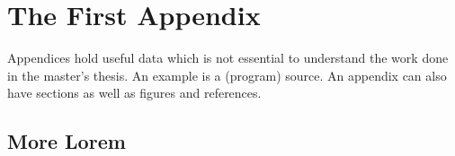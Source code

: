 \chapter{The First Appendix}
\label{app:A}
Appendices hold useful data which is not essential to understand the work
done in the master's thesis. An example is a (program) source.
An appendix can also have sections as well as figures and references\cite{h2g2}.

\section{More Lorem}


%
%
%
%

